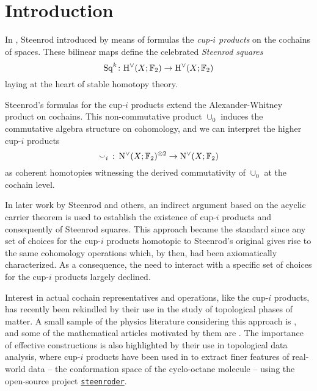 
\section{Introduction}\label{s:introduction}

In \cite{steenrod1947products}, Steenrod introduced by means of formulas the \textit{\mbox{cup-$i$} products} on the cochains of spaces.
These bilinear maps define the celebrated \textit{Steenrod squares}
\[
\operatorname{Sq}^k \colon \mathrm{H}^\vee(X; {\mathbb{F}_2}) \to \mathrm{H}^\vee(X; {\mathbb{F}_2})
\]
laying at the heart of stable homotopy theory.

Steenrod's formulas for the \mbox{cup-$i$} products extend the Alexander-Whitney product on cochains.
This non-commutative product $\cup_0$ induces the commutative algebra structure on cohomology, and we can interpret the higher \mbox{cup-$i$} products
\[
\smallsmile_i\ \colon \operatorname{N^{\vee}}(X; {\mathbb{F}_2})^{\otimes 2} \to \operatorname{N^{\vee}}(X; {\mathbb{F}_2})
\]
as coherent homotopies witnessing the derived commutativity of $\cup_0$ at the cochain level.

In later work by Steenrod and others, an indirect argument based on the acyclic carrier theorem is used to establish the existence of \mbox{cup-$i$} products and consequently of Steenrod squares.
This approach became the standard since any set of choices for the \mbox{cup-$i$} products homotopic to Steenrod's original gives rise to the same cohomology operations which, by then, had been axiomatically characterized.
As a consequence, the need to interact with a specific set of choices for the \mbox{cup-$i$} products largely declined.

Interest in actual cochain representatives and operations, like the \mbox{cup-$i$} products, has recently been rekindled by their use in the study of topological phases of matter.
A small sample of the physics literature considering this approach is \cite{gaiotto2016spin, kapustin2017fermionic, meng2018classification, wang2020construction, barkeshli2021classification, tata2021anomalies, tata2021cubical}, and some of the mathematical articles motivated by them are \cite{brumfiel2016pontrjagin, brumfiel2018pontrjagin, medina2020cartan, medina2021adem}.
The importance of effective constructions is also highlighted by their use in topological data analysis, where cup-$i$ products have been used in \cite{medina2022per_st} to extract finer features of real-world data -- the conformation space of the cyclo-octane molecule -- using the open-source project \href{https://github.com/Steenroder/steenroder}{\texttt{steenroder}}.

